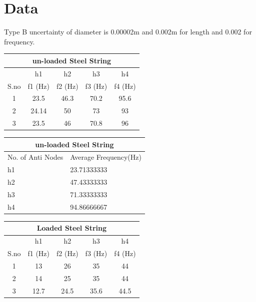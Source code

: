 
\section{Data}
Type B uncertainty of diameter is 0.00002m and 0.002m for length and 0.002 for frequency. 

\begin{center}
\begin{tabular}{|c|c|c|c|c|}
\hline
\multicolumn{5}{|c|}{\textbf{un-loaded Steel String}} \\ \hline
       & h1        & h2        & h3        & h4       \\ \hline
S.no   & f1 (Hz)   & f2 (Hz)   & f3  (Hz)  & f4 (Hz)  \\ \hline
1      & 23.5      & 46.3      & 70.2      & 95.6     \\ \hline
2      & 24.14     & 50        & 73        & 93       \\ \hline
3      & 23.5      & 46        & 70.8      & 96       \\ \hline
\end{tabular}
\end{center}

\begin{center}
\begin{tabular}{|l|l|}
\hline
\multicolumn{2}{|c|}{\textbf{un-loaded Steel String}} \\ \hline
No. of Anti   Nodes      & Average Frequency(Hz)      \\ \hline
h1                       & 23.71333333                \\ \hline
h2                       & 47.43333333                \\ \hline
h3                       & 71.33333333                \\ \hline
h4                       & 94.86666667                \\ \hline
\end{tabular}
\end{center}

\begin{center}
\begin{tabular}{|c|c|c|c|c|}
\hline
\multicolumn{5}{|c|}{\textbf{Loaded Steel String}} \\ \hline
      & h1       & h2       & h3        & h4       \\ \hline
S.no  & f1 (Hz)  & f2 (Hz)  & f3  (Hz)  & f4 (Hz)  \\ \hline
1     & 13       & 26       & 35        & 44       \\ \hline
2     & 14       & 25       & 35        & 44       \\ \hline
3     & 12.7     & 24.5     & 35.6      & 44.5     \\ \hline
\end{tabular}
\end{center}


